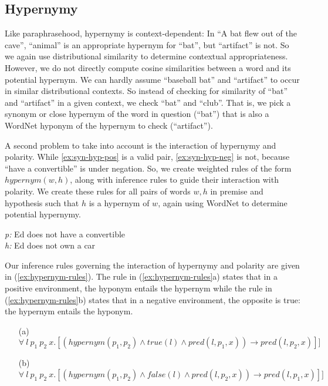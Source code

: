 \subsection*{Hypernymy}

Like paraphrasehood, hypernymy is context-dependent: In ``A bat flew
out of the cave'', ``animal'' is an appropriate hypernym for ``bat'',
but ``artifact'' is not. So we again use distributional similarity to
determine contextual appropriateness. However, we do not directly
compute cosine similarities between a word and its potential hypernym.
We can hardly assume ``baseball bat'' and ``artifact'' to occur in
similar distributional contexts. So instead of checking for similarity
of ``bat'' and ``artifact'' in a given context, we check ``bat'' and
``club''. That is, we pick a synonym or close hypernym of the word in
question (``bat'') that is also a WordNet hyponym of the hypernym to
check (``artifact'').

A second problem to take into account is the interaction of hypernymy
and polarity. While  \eqref{ex:syn-hyp-pos} is a valid pair, 
\eqref{ex:syn-hyp-neg} is not, because ``have a convertible'' is under
negation. So, we create weighted rules of the form $hypernym(w, h)$,
along with inference rules to guide their interaction with polarity.
We create these rules for all pairs of words $w, h$ in premise and
hypothesis such that $h$ is a hypernym of $w$, again using WordNet to
determine potential hypernymy. 

\begin{example}\label{ex:syn-hyp-neg}
{\it p:} Ed does not have a convertible \\
{\it h:} Ed does not own a car
\end{example}
 
Our inference rules governing the interaction of hypernymy and
polarity are given in (\ref{ex:hypernym-rules}).
The rule in (\ref{ex:hypernym-rules}a) states that in a positive environment,
the hyponym entails the hypernym while the rule in (\ref{ex:hypernym-rules}b)
states that in a negative environment, the opposite is true: the hypernym
entails the hyponym.

\begin{example}\label{ex:hypernym-rules}
\begin{itemize}
  \item[(a)] $\forall~l~p_1~p_2~x.[(hypernym(p_1,p_2) \land true(l) \land pred(l,p_1,x)) \rightarrow pred(l,p_2,x)]]$
  \item[(b)] $\forall~l~p_1~p_2~x.[(hypernym(p_1,p_2) \land false(l) \land pred(l,p_2,x)) \rightarrow pred(l,p_1,x)]]$
\end{itemize}
\end{example}



